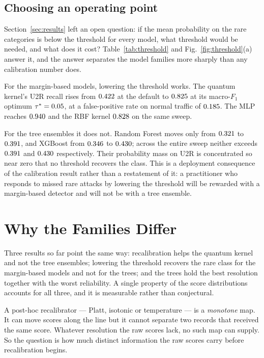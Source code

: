 \documentclass[journal]{IEEEtran}
\begin{document}
\subsection{Choosing an operating point}
Section~\ref{sec:results} left an open question: if the mean probability on
the rare categories is below the threshold for every model, what threshold
would be needed, and what does it cost? Table~\ref{tab:threshold} and
Fig.~\ref{fig:threshold}(a) answer it, and the answer separates the model
families more sharply than any calibration number does.

For the margin-based models, lowering the threshold works. The quantum
kernel's U2R recall rises from $0.422$ at the default to
$0.825$ at its macro-$F_1$ optimum $\tau^{\ast}=0.05$,
at a false-positive rate on normal traffic of $0.185$. The MLP reaches
$0.940$ and the RBF kernel $0.828$ on the same
sweep.

For the tree ensembles it does not. Random Forest moves only from
$0.321$ to $0.391$, and XGBoost from
$0.346$ to $0.430$; across the entire sweep neither
exceeds $0.391$ and $0.430$ respectively. Their
probability mass on U2R is concentrated so near zero that no threshold
recovers the class. This is a deployment consequence of the calibration
result rather than a restatement of it: a practitioner who responds to
missed rare attacks by lowering the threshold will be rewarded with a
margin-based detector and will not be with a tree ensemble.

\section{Why the Families Differ}\label{sec:mechanism}

Three results so far point the same way: recalibration helps the quantum
kernel and not the tree ensembles; lowering the threshold recovers the rare
class for the margin-based models and not for the trees; and the trees hold
the best resolution together with the worst reliability. A single property
of the score distributions accounts for all three, and it is measurable
rather than conjectural.

A post-hoc recalibrator --- Platt, isotonic or temperature --- is a
\emph{monotone} map. It can move scores along the line but it cannot
separate two records that received the same score. Whatever resolution the
raw scores lack, no such map can supply. So the question is how much
distinct information the raw scores carry before recalibration begins.
\end{document}
